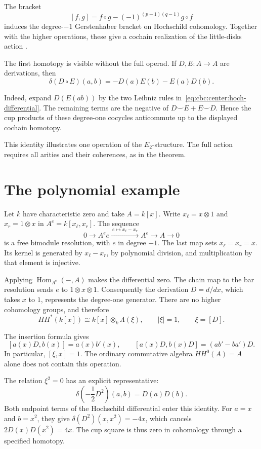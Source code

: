 The bracket
\[
 [f,g]=f\circ g-(-1)^{(p-1)(q-1)}g\circ f
\]
induces the degree-$-1$ Gerstenhaber bracket on Hochschild cohomology.
Together with the higher operations, these give a cochain realization of the little-disks action
\cite[\S7, Corollary~1]{KontsevichSoibelmanDeligne}.

The first homotopy is visible without the full operad.
If $D,E:A\to A$ are derivations, then
\[
 \delta(D\circ E)(a,b)
   =-D(a)E(b)-E(a)D(b).
\]

Indeed, expand $D(E(ab))$ by the two Leibniz rules in~\eqref{eq:cbc:center:hoch-differential}.
The remaining terms are the negative of $D\smile E+E\smile D$.
Hence the cup products of these degree-one cocycles anticommute up to the displayed cochain homotopy.

This identity illustrates one operation of the $E_2$-structure.
The full action requires all arities and their coherences, as in the theorem.

\section{The polynomial example}

Let $k$ have characteristic zero and take $A=k[x]$.
Write $x_\ell=x\otimes1$ and $x_r=1\otimes x$ in $A^e=k[x_\ell,x_r]$.
The sequence
\begin{equation}\label{eq:cbc:center:polynomial-resolution}
 0\longrightarrow A^e e
   \xrightarrow{\ e\mapsto x_\ell-x_r\ }
   A^e\longrightarrow A\longrightarrow0
\end{equation}
is a free bimodule resolution, with $e$ in degree $-1$.
The last map sets $x_\ell=x_r=x$.
Its kernel is generated by $x_\ell-x_r$, by polynomial division, and multiplication by that element is injective.

Applying $\operatorname{Hom}_{A^e}(-,A)$ makes the differential zero.
The chain map to the bar resolution sends $e$ to $1\otimes x\otimes1$.
Consequently the derivation $D=d/dx$, which takes $x$ to $1$, represents the degree-one generator.
There are no higher cohomology groups, and therefore
\[
 HH^*(k[x])\cong k[x]\otimes_k\Lambda(\xi),
 \qquad |\xi|=1,\qquad \xi=[D].
\]

The insertion formula gives
\[
 [a(x)D,b(x)]=a(x)b'(x),\qquad
 [a(x)D,b(x)D]=(a b'-b a')D.
\]
In particular, $[\xi,x]=1$.
The ordinary commutative algebra $HH^0(A)=A$ alone does not contain this operation.

The relation $\xi^2=0$ has an explicit representative:
\[
 \delta\!\left(-\frac12D^2\right)(a,b)=D(a)D(b).
\]
Both endpoint terms of the Hochschild differential enter this identity.
For $a=x$ and $b=x^2$, they give
$\delta(D^2)(x,x^2)=-4x$, which cancels $2D(x)D(x^2)=4x$.
The cup square is thus zero in cohomology through a specified homotopy.

